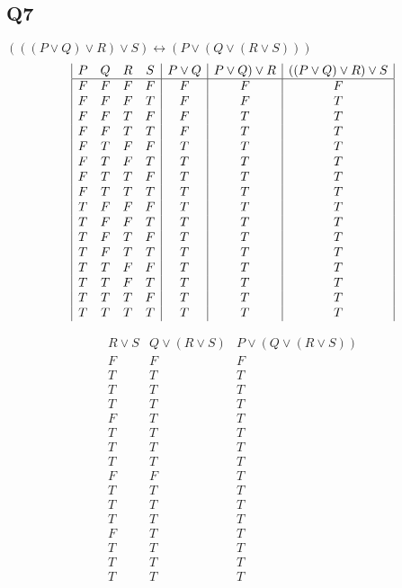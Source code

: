 \documentclass[a4paper,12pt]{article}
\begin{document}
\subsection{Q7}
$(((P \vee Q) \vee R) \vee S) \leftrightarrow (P \vee (Q \vee (R \vee S)))$\\
\begin{displaymath}
\begin {array} {|c c c c|c|c|c|}
P & Q & R & S &
P \vee Q &
P \vee Q) \vee R &
((P \vee Q) \vee R )\vee S \\
\hline
F & F & F & F & F & F & F\\
F & F & F & T & F & F & T\\
F & F & T & F & F & T & T\\
F & F & T & T & F & T & T\\
F & T & F & F & T & T & T\\
F & T & F & T & T & T & T\\
F & T & T & F & T & T & T\\
F & T & T & T & T & T & T\\
T & F & F & F & T & T & T\\
T & F & F & T & T & T & T\\
T & F & T & F & T & T & T\\
T & F & T & T & T & T & T\\
T & T & F & F & T & T & T\\
T & T & F & T & T & T & T\\
T & T & T & F & T & T & T\\
T & T & T & T & T & T & T\\
\end{array}
\end{displaymath}

\begin{displaymath}
\begin {array} {|c|c|c|}
R \vee S &
Q \vee (R \vee S) &
P \vee (Q \vee (R \vee S))\\
\hline

F & F & F\\
T & T & T\\
T & T & T\\
T & T & T\\
F & T & T\\
T & T & T\\
T & T & T\\
T & T & T\\
F & F & T\\
T & T & T\\
T & T & T\\
T & T & T\\
F & T & T\\
T & T & T\\
T & T & T\\
T & T & T\\
\end{array}
\end{displaymath}
\end{document}

